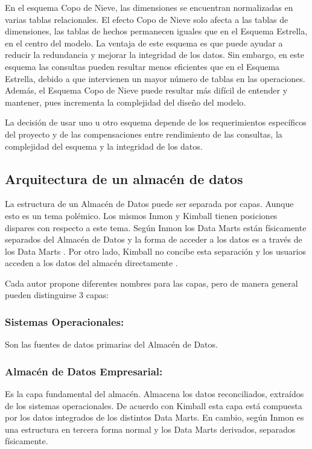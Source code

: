 En el esquema Copo de Nieve, las dimensiones se encuentran normalizadas en varias tablas relacionales. El efecto Copo de Nieve solo afecta a las tablas de 
dimensiones, las tablas de hechos permanecen iguales que en el Esquema Estrella, en el centro del modelo. La ventaja de este esquema es que puede ayudar a reducir 
la redundancia y mejorar la integridad de los datos. Sin embargo, en este esquema las consultas pueden resultar menos eficientes que en el Esquema Estrella, debido 
a que intervienen un mayor número de tablas en las operaciones. Adem\'as, el Esquema Copo de Nieve puede resultar m\'as dif\'icil de entender y mantener, pues incrementa la complejidad del 
dise\~{n}o del modelo.

La decisi\'on de usar uno u otro esquema depende de los requerimientos espec\'ificos del proyecto y de las compensaciones entre rendimiento de las consultas, 
la complejidad del esquema y la integridad de los datos.


\subsection{Arquitectura de un almac\'en de datos}

La estructura de un Almac\'en de Datos puede ser separada por capas. Aunque esto es un tema pol\'emico. Los mismos Inmon y Kimball tienen posiciones dispares 
con respecto a este tema. Seg\'un Inmon los Data Marts est\'an f\'isicamente separados del Almac\'en de Datos y la forma de acceder a los datos es a trav\'es de los Data Marts \cite{inmon}.
Por otro lado, Kimball no concibe esta separaci\'on y los usuarios acceden a los datos del almac\'en directamente \cite{kimball2011data}.

Cada autor propone diferentes nombres para las capas, pero de manera general pueden distinguirse 3 capas:

\subsubsection{Sistemas Operacionales:}
Son las fuentes de datos primarias del Almac\'en de Datos.

\subsubsection{Almac\'en de Datos Empresarial:} 
Es la capa fundamental del almac\'en. Almacena los datos reconciliados, extra\'idos de los sistemas operacionales. De acuerdo con Kimball esta capa est\'a compuesta
por los datos integrados de los distintos Data Marts. En cambio, seg\'un Inmon es una estructura en tercera forma normal y los Data Marts derivados, separados f\'isicamente. 

